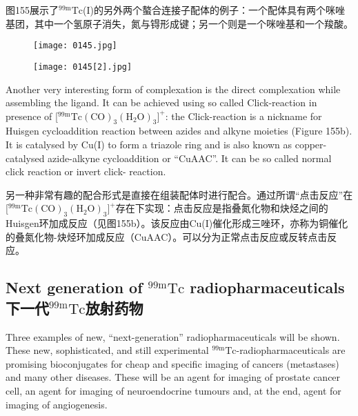 \documentclass[dvipsnames, svgnames,a4paper,11pt]{article}
\begin{document}
图155展示了${}^\mathrm{99m}\mathrm{Tc}$(I)的另外两个螯合连接子配体的例子：一个配体具有两个咪唑基团，其中一个氢原子消失，氮与锝形成键；另一个则是一个咪唑基和一个羧酸。

\begin{figure}[h]
	\centering
    \texttt{[image: 0145.jpg]}    
     \label{fig155}
\end{figure}

\begin{figure}[h]
	\centering
    \texttt{[image: 0145[2].jpg]}    
     \label{fig155b}
\end{figure}

Another very interesting form of complexation is the direct complexation while
assembling the ligand. It can be achieved using so called Click-reaction in presence
of [${}^\mathrm{99m}\mathrm{Tc(CO)_3(H_2O)_3]^+}$: the Click-reaction is a nickname for Huisgen cycloaddition
reaction between azides and alkyne moieties (Figure 155b). It is catalysed by Cu(I)
to form a triazole ring and is also known as copper-catalysed azide-alkyne
cycloaddition or “CuAAC”. It can be so called normal click reaction or invert click-
reaction.

另一种非常有趣的配合形式是直接在组装配体时进行配合。通过所谓“点击反应”在[${}^\mathrm{99m}\mathrm{Tc(CO)_3(H_2O)_3]^+}$存在下实现：点击反应是指叠氮化物和炔烃之间的Huisgen环加成反应（见图155b）。该反应由Cu(I)催化形成三唑环，亦称为铜催化的叠氮化物-炔烃环加成反应（CuAAC）。可以分为正常点击反应或反转点击反应。



\subsection{Next generation of ${}^\mathrm{99m}\mathrm{Tc}$ radiopharmaceuticals \\下一代${}^\mathrm{99m}\mathrm{Tc}$放射药物}
Three examples of new, “next-generation” radiopharmaceuticals will be shown.
These new, sophisticated, and still experimental ${}^\mathrm{99m}\mathrm{Tc}$-radiopharmaceuticals are
promising bioconjugates for cheap and specific imaging of cancers (metastases) and
many other diseases. These will be an agent for imaging of prostate cancer cell, an
agent for imaging of neuroendocrine tumours and, at the end, agent for imaging of
angiogenesis.
\end{document}
